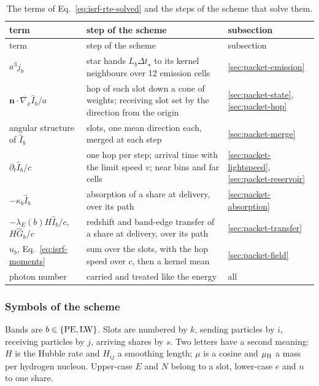 \begin{longtable}{>{\raggedright\arraybackslash}p{3.6cm}>{\raggedright\arraybackslash}p{7.4cm}>{\raggedright\arraybackslash}p{3.2cm}}
\caption{The terms of Eq.~\eqref{eq:isrf-rte-solved} and the steps of the
scheme that solve them.}
\label{tab:isrf-map}\\
\toprule
term & step of the scheme & subsection \\
\midrule
\endfirsthead
\toprule
term & step of the scheme & subsection \\
\midrule
\endhead
$a^3 j_b$ & star hands $L_b\Delta t_\star$ to its kernel neighbours over 12 emission cells & \ref{sec:packet-emission} \\
$\boldsymbol{n}\cdot\nabla_{\!x}\hat I_b/a$ & hop of each slot down a cone of weights; receiving slot set by the direction from the origin & \ref{sec:packet-state}, \ref{sec:packet-hop} \\
angular structure of $\hat I_b$ & 12 slots, one mean direction each, merged at each step & \ref{sec:packet-merge} \\
$\partial_t\hat I_b/c$ & one hop per step; arrival time with the limit speed $v$; near bins and far cells & \ref{sec:packet-lightspeed}, \ref{sec:packet-reservoir} \\
$-\kappa_b\hat I_b$ & absorption of a share at delivery, over its path & \ref{sec:packet-absorption} \\
$-\lambda_E(b)H\hat I_b/c$, $H\hat G_b/c$ & redshift and band-edge transfer of a share at delivery, over its path & \ref{sec:packet-transfer} \\
$u_b$, Eq.~\eqref{eq:isrf-moments} & sum over the slots, with the hop speed over $c$, then a kernel mean & \ref{sec:packet-field} \\
photon number & carried and treated like the energy & all \\
\bottomrule
\end{longtable}

\subsubsection{Symbols of the scheme}
\label{sec:packet-symbols}

Bands are $b\in\{{\rm PE},{\rm LW}\}$. Slots are numbered by $k$, sending
particles by $i$, receiving particles by $j$, arriving shares by $s$. Two
letters have a second meaning: $H$ is the Hubble rate and $H_{ij}$ a smoothing
length; $\mu$ is a cosine and $\mu_{\rm H}$ a mass per hydrogen nucleon.
Upper-case $E$ and $N$ belong to a slot, lower-case $e$ and $n$ to one share.

